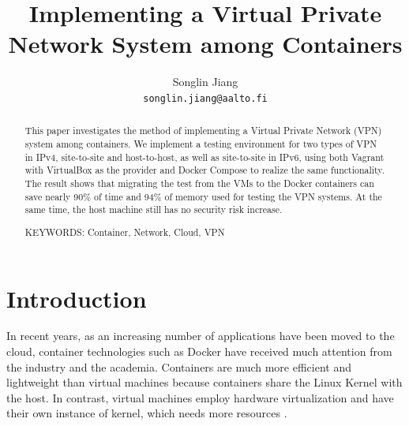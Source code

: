 \documentclass[article]{aaltoseries}
\begin{document}
 

\title{Implementing a Virtual Private Network System among Containers}

\author{Songlin Jiang%
\\\textnormal{\texttt{songlin.jiang@aalto.fi}}} %


\maketitle


\begin{abstract}
This paper investigates the method of implementing a Virtual Private Network (VPN) system among containers. We implement a testing environment for two types of VPN in IPv4, site-to-site and host-to-host, as well as site-to-site in IPv6, using both Vagrant with VirtualBox as the provider and Docker Compose to realize the same functionality. The result shows that migrating the test from the VMs to the Docker containers can save nearly 90\% of time and 94\% of memory used for testing the VPN systems. At the same time, the host machine still has no security risk increase.

\vspace{3mm}
\noindent KEYWORDS: Container, Network, Cloud, VPN

\end{abstract}




\section{Introduction}

In recent years, as an increasing number of applications have been moved to the cloud, container technologies such as Docker have received much attention from the industry and the academia. Containers are much more efficient and lightweight than virtual machines because containers share the Linux Kernel with the host. In contrast, virtual machines employ hardware virtualization and have their own instance of kernel, which needs more resources \cite{10.1145/2988336.2988337}.
\end{document}
